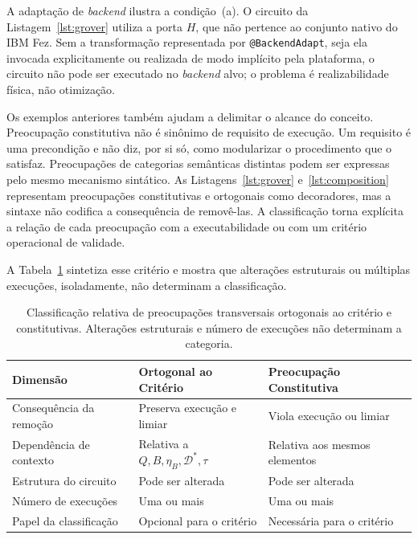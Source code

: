 \documentclass[sigconf]{acmart}
\begin{document}
A adaptação de \textit{backend} ilustra a condição~(a). O circuito da Listagem~\ref{lst:grover} utiliza a porta $H$, que não pertence ao conjunto nativo do IBM Fez. Sem a transformação representada por \texttt{@BackendAdapt}, seja ela invocada explicitamente ou realizada de modo implícito pela plataforma, o circuito não pode ser executado no \textit{backend} alvo; o problema é realizabilidade física, não otimização.

Os exemplos anteriores também ajudam a delimitar o alcance do conceito. Preocupação constitutiva não é sinônimo de requisito de execução. Um requisito é uma precondição e não diz, por si só, como modularizar o procedimento que o satisfaz. Preocupações de categorias semânticas distintas podem ser expressas pelo mesmo mecanismo sintático. As Listagens~\ref{lst:grover} e~\ref{lst:composition} representam preocupações constitutivas e ortogonais como decoradores, mas a sintaxe não codifica a consequência de removê-las. A classificação torna explícita a relação de cada preocupação com a executabilidade ou com um critério operacional de validade.

A Tabela~\ref{tab:concerns} sintetiza esse critério e mostra que alterações estruturais ou múltiplas execuções, isoladamente, não determinam a classificação.

\begin{table}[t]
  \caption{Classificação relativa de preocupações transversais ortogonais ao critério e constitutivas. Alterações estruturais e número de execuções não determinam a categoria.}
  \label{tab:concerns}
  \begin{tabular*}{\textwidth}{@{\extracolsep{\fill}}lll}
    \toprule
    \textbf{Dimensão} & \textbf{Ortogonal ao Critério} & \textbf{Preocupação Constitutiva} \\
    \midrule
    Consequência da remoção & Preserva execução e limiar & Viola execução ou limiar \\
    Dependência de contexto & Relativa a $Q,B,\eta_B,\mathcal{D}^*,\tau$ & Relativa aos mesmos elementos \\
    Estrutura do circuito   & Pode ser alterada          & Pode ser alterada \\
    Número de execuções     & Uma ou mais                & Uma ou mais \\
    Papel da classificação & Opcional para o critério    & Necessária para o critério \\
    \bottomrule
  \end{tabular*}
\end{table}
\end{document}
